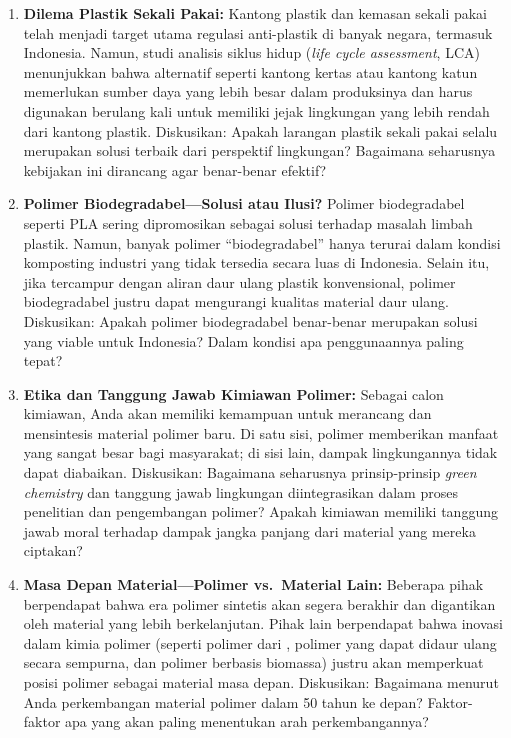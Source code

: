 \documentclass[12pt,a4paper,openany]{book}
\begin{document}
\begin{enumerate}[label=\textbf{\arabic*.}]

\item \textbf{Dilema Plastik Sekali Pakai:} Kantong plastik dan kemasan sekali pakai telah menjadi target utama regulasi anti-plastik di banyak negara, termasuk Indonesia. Namun, studi analisis siklus hidup (\textit{life cycle assessment}, LCA) menunjukkan bahwa alternatif seperti kantong kertas atau kantong katun memerlukan sumber daya yang lebih besar dalam produksinya dan harus digunakan berulang kali untuk memiliki jejak lingkungan yang lebih rendah dari kantong plastik. Diskusikan: Apakah larangan plastik sekali pakai selalu merupakan solusi terbaik dari perspektif lingkungan? Bagaimana seharusnya kebijakan ini dirancang agar benar-benar efektif?

\item \textbf{Polimer Biodegradabel---Solusi atau Ilusi?} Polimer biodegradabel seperti PLA sering dipromosikan sebagai solusi terhadap masalah limbah plastik. Namun, banyak polimer ``biodegradabel'' hanya terurai dalam kondisi komposting industri yang tidak tersedia secara luas di Indonesia. Selain itu, jika tercampur dengan aliran daur ulang plastik konvensional, polimer biodegradabel justru dapat mengurangi kualitas material daur ulang. Diskusikan: Apakah polimer biodegradabel benar-benar merupakan solusi yang viable untuk Indonesia? Dalam kondisi apa penggunaannya paling tepat?

\item \textbf{Etika dan Tanggung Jawab Kimiawan Polimer:} Sebagai calon kimiawan, Anda akan memiliki kemampuan untuk merancang dan mensintesis material polimer baru. Di satu sisi, polimer memberikan manfaat yang sangat besar bagi masyarakat; di sisi lain, dampak lingkungannya tidak dapat diabaikan. Diskusikan: Bagaimana seharusnya prinsip-prinsip \textit{green chemistry} dan tanggung jawab lingkungan diintegrasikan dalam proses penelitian dan pengembangan polimer? Apakah kimiawan memiliki tanggung jawab moral terhadap dampak jangka panjang dari material yang mereka ciptakan?

\item \textbf{Masa Depan Material---Polimer vs.\ Material Lain:} Beberapa pihak berpendapat bahwa era polimer sintetis akan segera berakhir dan digantikan oleh material yang lebih berkelanjutan. Pihak lain berpendapat bahwa inovasi dalam kimia polimer (seperti polimer dari , polimer yang dapat didaur ulang secara sempurna, dan polimer berbasis biomassa) justru akan memperkuat posisi polimer sebagai material masa depan. Diskusikan: Bagaimana menurut Anda perkembangan material polimer dalam 50 tahun ke depan? Faktor-faktor apa yang akan paling menentukan arah perkembangannya?

\end{enumerate}
\end{document}
